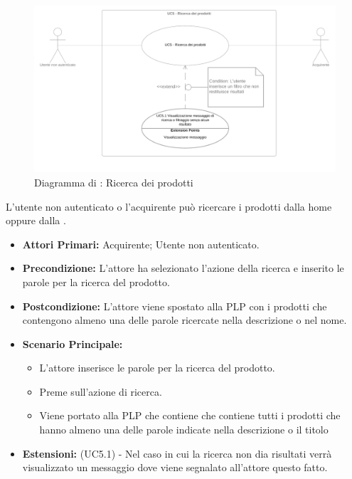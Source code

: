 
\begin{figure}[H]
    \centering
    \includegraphics[width=\textwidth]{Immagini/DiagrammiUC/UC5RicercaDeiProdotti.png}
    \caption{Diagramma di \actualUC: Ricerca dei prodotti} 
    \label{fig:RicercaDeiProdotti}
\end{figure}

L'utente non autenticato o l'acquirente può ricercare i prodotti dalla home oppure dalla .
\begin{itemize}
    \item \textbf{Attori Primari:} Acquirente; Utente non autenticato.
    \item \textbf{Precondizione:} L'attore ha selezionato l'azione della ricerca e inserito le parole per la ricerca del prodotto.
    \item \textbf{Postcondizione:} L'attore viene spostato alla PLP con i prodotti che contengono almeno una delle parole ricercate nella descrizione o nel nome. 
    \item \textbf{Scenario Principale:} 
    \begin{itemize}
        \item L'attore inserisce le parole per la ricerca del prodotto.
        \item Preme sull'azione di ricerca.
        \item Viene portato alla PLP che contiene che contiene tutti i prodotti che hanno almeno una delle parole indicate nella descrizione o il titolo
    \end{itemize}
    \item \textbf{Estensioni:} (UC5.1) - Nel caso in cui la ricerca non dia risultati verrà visualizzato un messaggio dove viene segnalato all'attore questo fatto.
\end{itemize}


